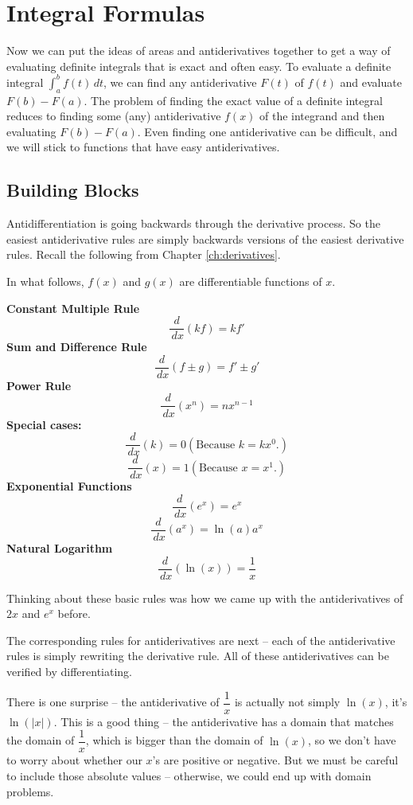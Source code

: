 \section{Integral Formulas}
\label{sec:formulas}
Now we can put the ideas of areas and antiderivatives together to get a way of evaluating definite integrals that is exact and often easy. To evaluate a definite integral $\int_a^b f(t)\,dt$, we can find any antiderivative $F(t)$ of $f(t)$ and evaluate $F(b)-F(a)$. The problem of finding the exact value of a definite integral reduces to finding some (any) antiderivative $f(x)$ of the integrand and then evaluating $F(b)-F(a)$. Even finding one antiderivative can be difficult, and we will stick to functions that have easy antiderivatives.

\subsection{Building Blocks}
Antidifferentiation is going backwards through the derivative process. So the easiest antiderivative rules are simply backwards versions of the easiest derivative rules. Recall the following from Chapter \ref{ch:derivatives}.

\begin{theorem}
In what follows, $f(x)$ and $g(x)$ are differentiable functions of $x$.

{\bf Constant Multiple Rule}
$$\dfrac{d}{\, dx }(kf)=kf'$$
{\bf Sum and Difference Rule}
$$\dfrac{d}{\, dx }(f\pm g)=f'\pm g'$$
{\bf Power Rule}
$$\dfrac{d}{\, dx }(x^n)=nx^{n-1}$$
{\bf Special cases:}
$$\dfrac{d}{\, dx }(k) = 0 (\text{Because }k=kx^0.)$$
$$\dfrac{d}{\, dx }(x) = 1 (\text{Because }x=x^1.)$$
{\bf Exponential Functions}
$$\dfrac{d}{\, dx }(e^x)=e^x$$
$$\dfrac{d}{\, dx }(a^x)=\ln(a)a^x$$
{\bf Natural Logarithm}
$$\dfrac{d}{\, dx }(\ln(x))=\dfrac{1}{x}$$
\end{theorem}
Thinking about these basic rules was how we came up with the antiderivatives of $2x$ and $e^x$ before.

The corresponding rules for antiderivatives are next – each of the antiderivative rules is simply rewriting the derivative rule. All of these antiderivatives can be verified by differentiating.

There is one surprise – the antiderivative of $\dfrac{1}{x}$ is actually not simply $\ln(x)$, it's $\ln(|x|)$. This is a good thing – the antiderivative has a domain that matches the domain of $\dfrac{1}{x}$, which is bigger than the domain of $\ln(x)$, so we don’t have to worry about whether our $x$'s are positive or negative. But we must be careful to include those absolute values – otherwise, we could end up with domain problems.

